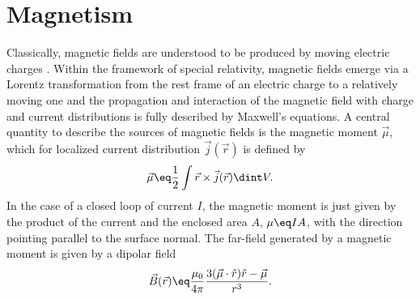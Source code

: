 \documentclass[\main/dresen_thesis.tex]{subfiles}
\begin{document}
  \section{Magnetism}\label{ch:theoreticalBackground:magnetism}
    Classically, magnetic fields are understood to be produced by moving electric charges \cite{Jackson_1999_Class, Blundell_2001_Magne}.
    Within the framework of special relativity, magnetic fields emerge via a Lorentz transformation from the rest frame of an electric charge to a relatively moving one and the propagation and interaction of the magnetic field with charge and current distributions is fully described by Maxwell's equations.
    A central quantity to describe the sources of magnetic fields is the magnetic moment $\vec{\mu}$, which for localized current distribution $\vec{j}(\vec{r})$ is defined by
    \begin{align}
      \vec{\mu} \eq \frac{1}{2} \int \vec{r} \times \vec{j}(\vec{r}) \dint V .
    \end{align}
    In the case of a closed loop of current $I$, the magnetic moment is just given by the product of the current and the enclosed area $A$, $\mu \eq I A$, with the direction pointing parallel to the surface normal.
    The far-field generated by a magnetic moment is given by a dipolar field
    \begin{align}\label{eq:theoreticalBackground:magnetism:dipolarField}
      \vec{B} (\vec{r}) \eq \frac{\mu_0}{4 \pi} \frac{3(\vec{\mu} \cdot \hat{r})\hat{r} - \vec{\mu}}{r^3}.
    \end{align}
\end{document}
